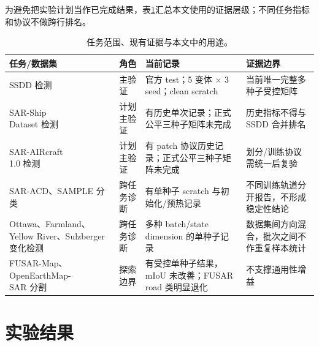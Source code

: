 \documentclass[UTF8,12pt,a4paper]{ctexart}
\begin{document}
为避免把实验计划当作已完成结果，表\ref{tab:evidence_scope}汇总本文使用的证据层级；不同任务指标和协议不做跨行排名。
\begin{table}[H]\centering\scriptsize
\caption{任务范围、现有证据与本文中的用途。}
\label{tab:evidence_scope}
\setlength{\tabcolsep}{4.5pt}
\begin{tabularx}{.99\linewidth}{p{2.1cm}p{2.4cm}p{4.8cm}X}
\toprule
任务/数据集 & 角色 & 当前记录 & 证据边界\\
\midrule
SSDD 检测 & 主验证 & 官方 test；5 变体 $\times$ 3 seed；clean scratch & 当前唯一完整多种子受控矩阵\\
\shortstack[l]{SAR-Ship\\Dataset} 检测 & 计划主验证 & 有历史单次记录；正式公平三种子矩阵未完成 & 历史指标不得与 SSDD 合并排名\\
\shortstack[l]{SAR-AIRcraft\\1.0} 检测 & 计划主验证 & 有 patch 协议历史记录；正式公平三种子矩阵未完成 & 划分/训练协议需统一后复验\\
SAR-ACD、SAMPLE 分类 & 跨任务诊断 & 有单种子 scratch 与初始化/预热记录 & 不同训练轨道分开报告，不形成稳定性结论\\
Ottawa、Farmland、Yellow River、Sulzberger 变化检测 & 跨任务诊断 & 多种 batch/state dimension 的单种子记录 & 数据集间方向混合，批次之间不作重复样本统计\\
FUSAR-Map、\shortstack[l]{OpenEarthMap-\\SAR} 分割 & 探索边界 & 有受控单种子结果，mIoU 未改善；FUSAR road 类明显退化 & 不支撑通用性增益\\
\bottomrule
\end{tabularx}
\end{table}
\section{实验结果}
\end{document}
